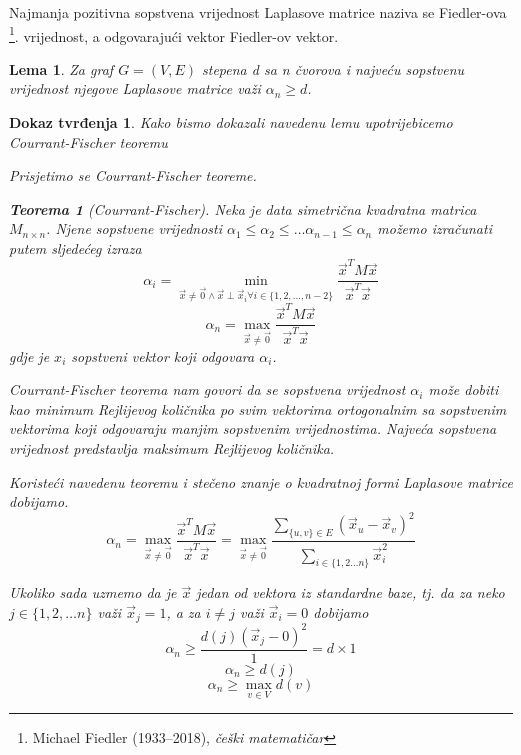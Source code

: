 \documentclass[11pt]{article}
\newtheorem{theorem}{Teorema}
\newtheorem*{custom_proof}{Dokaz tvrđenja}
\newtheorem{lema}{Lema}
\begin{document}
	Najmanja pozitivna sopstvena vrijednost Laplasove matrice naziva se Fiedler-ova \footnote{Michael Fiedler (1933–2018), \textit{češki matematičar}}. vrijednost, a odgovarajući vektor Fiedler-ov vektor.

	\begin{lema}
		Za graf $G=(V,E)$ stepena d sa n čvorova i najveću sopstvenu vrijednost njegove Laplasove matrice važi $\alpha_n \geq d$.
		
	\end{lema}
	\begin{custom_proof}
		
		Kako bismo dokazali navedenu lemu upotrijebicemo Courrant-Fischer teoremu
	
		Prisjetimo se Courrant-Fischer teoreme.
	
		\begin{theorem}[Courrant-Fischer]
			Neka je data simetrična kvadratna matrica $M_{n \times n}$. Njene sopstvene vrijednosti $\alpha_1 \leq \alpha_2 \leq \dots \alpha_{n-1} \leq \alpha_n$
			možemo izračunati putem sljedećeg izraza
			\[
				\alpha_i = \min_{\vec{x} \neq \vec{0} \land \vec{x} \perp \vec{x}_i \forall i \in \{1,2, \dots, n-2\}} \frac{\vec{x}^T M \vec{x}}{\vec{x}^T\vec{x}} 
			\]
			\[
				\alpha_n = \max_{\vec{x} \neq \vec{0}} \frac{\vec{x}^T M \vec{x}}{\vec{x}^T\vec{x}} 
			\]
			gdje je $x_i$ sopstveni vektor koji odgovara $\alpha_i$.

			Courrant-Fischer teorema nam govori da se sopstvena vrijednost $\alpha_i$ može dobiti kao minimum Rejlijevog količnika po svim vektorima 
			ortogonalnim sa sopstvenim vektorima koji odgovaraju manjim sopstvenim vrijednostima. Najveća sopstvena vrijednost predstavlja maksimum Rejlijevog količnika. 
		\end{theorem}

		Koristeći navedenu teoremu i stečeno znanje o kvadratnoj formi Laplasove matrice dobijamo.
			\[
			\alpha_n = \max_{\vec{x} \neq \vec{0}} \frac{\vec{x}^T M \vec{x}}{\vec{x}^T\vec{x}} = \max_{\vec{x} \neq \vec{0}} \frac{ \sum_{\{u,v\} \in E} (\vec{x}_u - \vec{x}_v)^2 }{ \sum_{i \in \{1,2 \dots n\}} \vec{x}_i^2}
		\]
	
		Ukoliko sada uzmemo da je $\vec{x}$ jedan od vektora iz standardne baze, tj. da za neko $j \in \{1,2, \dots n\}$ važi $\vec{x}_j = 1$, a za $i \neq j$ važi $\vec{x}_i = 0$ dobijamo
		\[
		\alpha_n \geq \frac{ d(j) (\vec{x}_j - 0)^2 }{1} = d \times 1  
		\]
		\[
			\alpha_n \geq d(j)  
		\]
		\[
			\alpha_n \geq \max_{v \in V }d(v)  
		\]
		\end{custom_proof}
\end{document}
